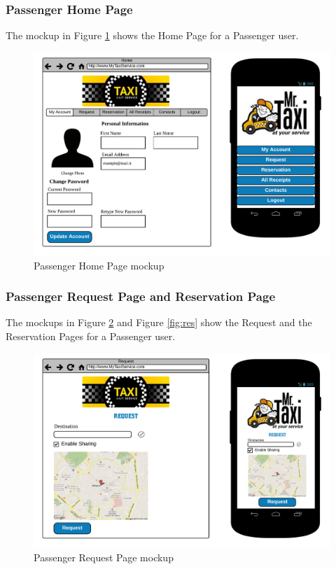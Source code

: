 \subsubsection{Passenger Home Page}
The mockup in Figure \ref{fig:passhome} shows the Home Page for a Passenger user.

\begin{figure}[htbp]
\centering
\includegraphics[width=\textwidth]{cpt/img/PassHome}
\caption{Passenger Home Page mockup}
\label{fig:passhome}
\end{figure}
\clearpage

\subsubsection{Passenger Request Page and Reservation Page}
The mockups in Figure \ref{fig:req} and Figure \ref{fig:res} show the Request and the Reservation Pages for a Passenger user.

\begin{figure}[htbp]
\centering
\includegraphics[width=\textwidth]{cpt/img/PassReq}
\caption{Passenger Request Page mockup}
\label{fig:req}
\end{figure}

